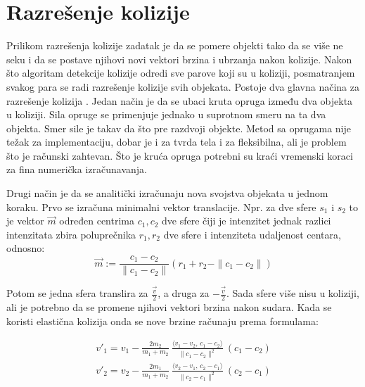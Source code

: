 \documentclass[12pt,oneside]{memoir}
\begin{document}
\section{Razrešenje kolizije}
\label{sec:razresenje}

Prilikom razrešenja kolizije zadatak je da se pomere objekti tako da se više ne seku i
da se postave njihovi novi vektori brzina i ubrzanja nakon kolizije.
Nakon što algoritam detekcije kolizije odredi sve parove koji su u koliziji, 
posmatranjem svakog para se radi razrešenje kolizije svih objekata.
Postoje dva glavna načina za razrešenje kolizija \cite{Moore}.
Jedan način je da se ubaci kruta opruga između dva objekta u koliziji.
Sila opruge se primenjuje jednako u suprotnom smeru na ta dva objekta.
Smer sile je takav da što pre razdvoji objekte. Metod sa oprugama nije težak 
za implementaciju, dobar je i za tvrda tela i za fleksibilna, ali je problem što je 
računski zahtevan. Što je kruća opruga potrebni su kraći vremenski koraci za fina 
numerička izračunavanja.

Drugi način je da se analitički izračunaju nova svojstva objekata u jednom koraku.
Prvo se izračuna minimalni vektor translacije. Npr. za dve sfere $s_1$ i $s_2$ to je vektor $\vec{m}$
određen centrima $c_1, c_2$ dve sfere čiji je intenzitet jednak razlici intenzitata zbira poluprečnika
$r_1, r_2$ dve sfere i intenziteta udaljenost centara, odnosno:
\begin{equation}
	\label{eq:razresenje2}
	 \vec{m} := \frac{{c_1 - c_2}} {\|{c_1 - c_2}\|} 
	(r_1 + r_2 - \| {c_1 - c_2} \| ) 
\end{equation}

Potom se jedna sfera translira za $ \frac{ \vec{v} }{ 2 }$, a druga za $ -\frac{ \vec{v} }{ 2 }$.
Sada sfere više nisu u koliziji, ali je potrebno da se promene njihovi vektori brzina nakon sudara.
Kada se koristi elastična kolizija onda se nove brzine računaju prema formulama:


\begin{equation}
	\label{eq:razresenje}
	\begin{split}
		{v}'_1= {v}_1-\frac{2 m_2}{m_1+m_2} \ \frac{\langle  {v}_1- {v}_2,\, {c}_1- {c}_2\rangle}{\| {c}_1- {c}_2\|^2} \ ( {c}_1- {c}_2) \\
		{v}'_2= {v}_2-\frac{2 m_1}{m_1+m_2} \ \frac{\langle  {v}_2- {v}_1,\, {c}_2- {c}_1\rangle}{\| {c}_2- {c}_1\|^2} \ ( {c}_2- {c}_1) 
	\end{split}
\end{equation}
\end{document}
